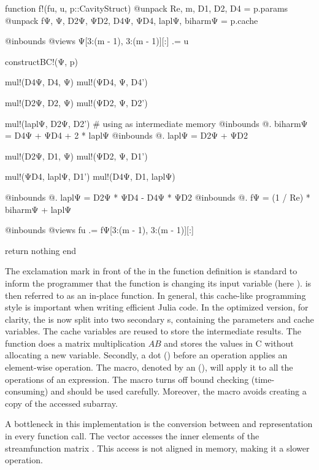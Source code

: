 \begin{jllisting}[caption=Optimized implementation of the nonlinear
  function $F$ in Julia \vspace{3pt}]
function f!(fu, u, p::CavityStruct)
    @unpack Re, m, D1, D2, D4 = p.params
    @unpack fΨ, Ψ, D2Ψ, ΨD2, D4Ψ, ΨD4, laplΨ, biharmΨ = p.cache

    @inbounds @views Ψ[3:(m - 1), 3:(m - 1)][:] .= u

    constructBC!(Ψ, p)

    mul!(D4Ψ, D4, Ψ)
    mul!(ΨD4, Ψ, D4')

    mul!(D2Ψ, D2, Ψ)
    mul!(ΨD2, Ψ, D2')

    mul!(laplΨ, D2Ψ, D2') # using as intermediate memory
    @inbounds @. biharmΨ = D4Ψ + ΨD4 + 2 * laplΨ
    @inbounds @. laplΨ = D2Ψ + ΨD2

    mul!(D2Ψ, D1, Ψ)
    mul!(ΨD2, Ψ, D1')

    mul!(ΨD4, laplΨ, D1')
    mul!(D4Ψ, D1, laplΨ)

    @inbounds @. laplΨ = D2Ψ * ΨD4 - D4Ψ * ΨD2
    @inbounds @. fΨ = (1 / Re) * biharmΨ + laplΨ

    @inbounds @views fu .= fΨ[3:(m - 1), 3:(m - 1)][:]

    return nothing
end
\end{jllisting}

The exclamation mark in front of the  in the function definition is
standard to inform the programmer that the function is changing its input
variable (here ).  is then referred to as an
in-place function. In general, this cache-like programming style is important
when writing efficient Julia code. In the optimized version, for clarity, the
 is now split into two secondary s, containing
the parameters and cache variables. The cache variables are reused to store the
intermediate results. The  function does a matrix
multiplication $AB$ and stores the values in C without allocating a new
variable. Secondly, a dot () before an operation applies an
element-wise operation. The macro, denoted by an (), will apply
it to all the operations of an expression. The  macro turns
off bound checking (time-consuming) and should be used carefully. Moreover, the
macro  avoids creating a copy of the accessed subarray.

A bottleneck in this implementation is the conversion between  and
 representation in every function call. The vector  accesses
the inner elements of the streamfunction matrix . This access is not
aligned in memory, making it a slower operation. \\


